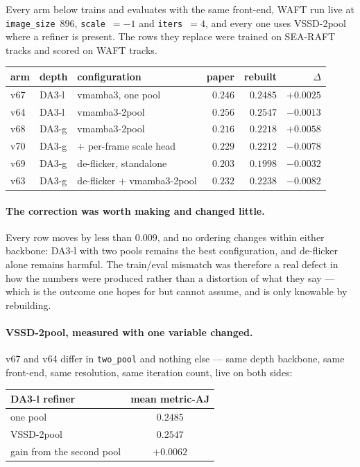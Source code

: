\documentclass[11pt,a4paper]{article}
\begin{document}
Every arm below trains and evaluates with the same front-end, WAFT run live at
\texttt{image\_size}~$896$, \texttt{scale}~$=-1$ and \texttt{iters}~$=4$, and every one uses
VSSD-2pool where a refiner is present. The rows they replace were trained on SEA-RAFT tracks and
scored on WAFT tracks.

\begin{center}\small
\begin{tabular}{lllrrr}
\toprule
arm & depth & configuration & paper & rebuilt & $\Delta$ \\
\midrule
v67 & DA3-l & vmamba3, one pool            & $0.246$ & $0.2485$ & $+0.0025$ \\
v64 & DA3-l & vmamba3-2pool                & $0.256$ & $\mathbf{0.2547}$ & $-0.0013$ \\
\midrule
v68 & DA3-g & vmamba3-2pool                & $0.216$ & $0.2218$ & $+0.0058$ \\
v70 & DA3-g & \quad $+$ per-frame scale head & $0.229$ & $0.2212$ & $-0.0078$ \\
v69 & DA3-g & de-flicker, standalone       & $0.203$ & $0.1998$ & $-0.0032$ \\
v63 & DA3-g & de-flicker $+$ vmamba3-2pool & $0.232$ & $0.2238$ & $-0.0082$ \\
\bottomrule
\end{tabular}
\end{center}

\paragraph{The correction was worth making and changed little.} Every row moves by less than
$0.009$, and no ordering changes within either backbone: DA3-l with two pools remains the best
configuration, and de-flicker alone remains harmful. The train/eval mismatch was therefore a real
defect in how the numbers were produced rather than a distortion of what they say --- which is the
outcome one hopes for but cannot assume, and is only knowable by rebuilding.

\paragraph{VSSD-2pool, measured with one variable changed.} v67 and v64 differ in
\texttt{two\_pool} and nothing else --- same depth backbone, same front-end, same resolution,
same iteration count, live on both sides:

\begin{center}\small
\begin{tabular}{lc}
\toprule
DA3-l refiner & mean metric-AJ \\
\midrule
one pool               & $0.2485$ \\
VSSD-2pool             & $\mathbf{0.2547}$ \\
\midrule
gain from the second pool & $+0.0062$ \\
\bottomrule
\end{tabular}
\end{center}
\end{document}
